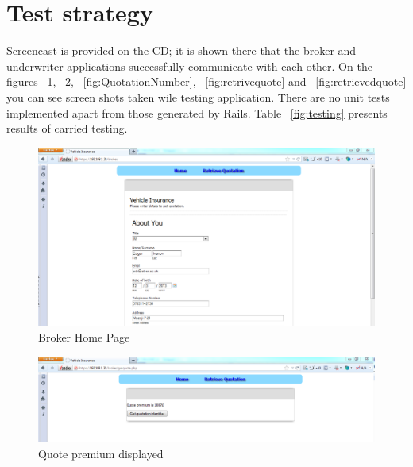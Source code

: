 \documentclass[10pt,a4paper,headinclude=true,twoside]{report}
\begin{document}
\section{Test strategy}

Screencast is provided on the CD; it is shown there that the broker and underwriter applications successfully communicate with each other. On the figures ~\ref{fig:brokerMain}, ~\ref{fig:quotepremium}, ~\ref{fig:QuotationNumber}, ~\ref{fig:retrivequote} and ~\ref{fig:retrievedquote} you can see screen shots taken wile testing application. There are no unit tests implemented apart from those generated by Rails. Table ~\ref{fig:testing} presents results of carried testing.

\begin{figure}[H]
\centering
\centerline{\includegraphics[scale=0.45]{./brokerMain}}
\caption{Broker Home Page}
\label{fig:brokerMain}
\end{figure} 

\begin{figure}[H]
\centering
\centerline{\includegraphics[scale=0.45]{./quotepremium}}
\caption{Quote premium displayed}
\label{fig:quotepremium}
\end{figure} 
\end{document}
